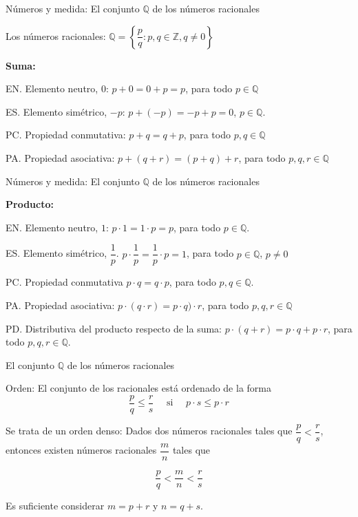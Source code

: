 \documentclass[
  ignorenonframetext,
]{beamer}
\begin{document}
\begin{frame}{Números y medida: El conjunto \(\mathbb{Q}\) de los
números racionales}
\protect\hypertarget{nuxfameros-y-medida-el-conjunto-mathbbq-de-los-nuxfameros-racionales}{}

Los números racionales:
\(\mathbb{Q} = \left\{ \dfrac{p}{q}: p,q \in \mathbb{Z}, q \neq 0 \right\}\)

\textbf{Suma:}

EN. Elemento neutro, \(0\): \(p+0=0+p=p\), para todo
\(p \in \mathbb{Q}\)

ES. Elemento simétrico, \(-p\): \(p +(-p) = -p+p = 0\),
\(p \in \mathbb{Q}\).

PC. Propiedad conmutativa: \(p+q =q+p\), para todo
\(p,q \in \mathbb{Q}\)

PA. Propiedad asociativa: \(p+(q+r) = (p+q)+r\), para todo
\(p,q,r \in \mathbb{Q}\)

\end{frame}

\begin{frame}{Números y medida: El conjunto \(\mathbb{Q}\) de los
números racionales}
\protect\hypertarget{nuxfameros-y-medida-el-conjunto-mathbbq-de-los-nuxfameros-racionales-1}{}

\textbf{Producto:}

EN. Elemento neutro, \(1\): \(p \cdot 1 = 1 \cdot p =p\), para todo
\(p \in \mathbb{Q}\).

ES. Elemento simétrico, \(\dfrac{1}{p}\).
\(p \cdot \dfrac{1}{p} = \dfrac{1}{p} \cdot p =1\), para todo
\(p \in \mathbb{Q}\), \(p \neq 0\)

PC. Propiedad conmutativa \(p \cdot q = q \cdot p\), para todo
\(p,q \in \mathbb{Q}\).

PA. Propiedad asociativa: \(p\cdot (q \cdot r) = p \cdot q)\cdot r\),
para todo \(p,q,r \in \mathbb{Q}\)

PD. Distributiva del producto respecto de la suma:
\(p \cdot (q+r) = p \cdot q + p \cdot r\), para todo
\(p,q,r \in \mathbb{Q}\).

\end{frame}

\begin{frame}{El conjunto \(\mathbb{Q}\) de los números racionales}
\protect\hypertarget{el-conjunto-mathbbq-de-los-nuxfameros-racionales}{}

Orden: El conjunto de los racionales está ordenado de la forma \[
\dfrac{p}{q} \leq \dfrac{r}{s} \quad \text{ si } \quad  p\cdot  s \leq p \cdot r
\]

Se trata de un orden denso: Dados dos números racionales tales que
\(\dfrac{p}{q} < \dfrac{r}{s}\), entonces existen números racionales
\(\dfrac{m}{n}\) tales que

\[
\dfrac{p}{q} < \dfrac{m}{n} < \dfrac{r}{s}
\]

Es suficiente considerar \(m=p+r\) y \(n=q+s\).

\end{frame}
\end{document}
